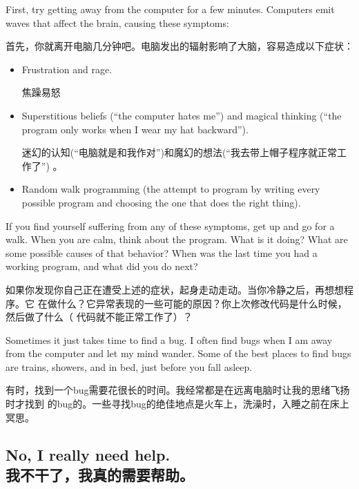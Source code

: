 \documentclass[10pt]{book}
\begin{document}
\begin{CJK}{UTF8}{gbsn}
First, try getting away from the computer for a few minutes.
Computers emit waves that affect the brain, causing these
symptoms:

首先，你就离开电脑几分钟吧。电脑发出的辐射影响了大脑，容易造成以下症状：

\begin{itemize}

\item Frustration and rage.

焦躁易怒

\item Superstitious beliefs (``the computer hates me'') and
magical thinking (``the program only works when I wear my
hat backward'').

迷幻的认知(``电脑就是和我作对'')和魔幻的想法(``我去带上帽子程序就正常工作了'')
。

\item Random walk programming (the attempt to program by writing
every possible program and choosing the one that does the right
thing).

\end{itemize}

If you find yourself suffering from any of these symptoms, get
up and go for a walk.  When you are calm, think about the program.
What is it doing?  What are some possible causes of that
behavior?  When was the last time you had a working program,
and what did you do next?

如果你发现你自己正在遭受上述的症状，起身走动走动。当你冷静之后，再想想程序。它
在做什么？它异常表现的一些可能的原因？你上次修改代码是什么时候，然后做了什么（
代码就不能正常工作了）？

Sometimes it just takes time to find a bug.  I often find bugs
when I am away from the computer and let my mind wander.  Some
of the best places to find bugs are trains, showers, and in bed,
just before you fall asleep.

有时，找到一个bug需要花很长的时间。我经常都是在远离电脑时让我的思绪飞扬时才找到
的bug的。一些寻找bug的绝佳地点是火车上，洗澡时，入睡之前在床上冥思。

\subsection{No, I really need help.\\我不干了，我真的需要帮助。}


\end{CJK}
\end{document}
